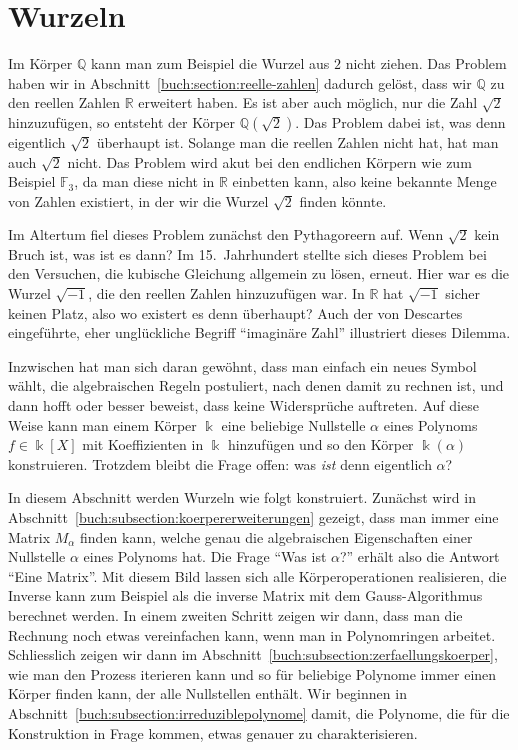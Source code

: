 %
%
%
\section{Wurzeln
\label{buch:section:wurzeln}}
Im Körper $\mathbb{Q}$ kann man zum Beispiel die Wurzel aus $2$ nicht 
ziehen.
Das Problem haben wir in Abschnitt~\ref{buch:section:reelle-zahlen}
dadurch gelöst, dass wir $\mathbb{Q}$ zu den reellen Zahlen $\mathbb{R}$
erweitert haben.
Es ist aber auch möglich, nur die Zahl $\sqrt{2}$ hinzuzufügen,
so entsteht der Körper $\mathbb{Q}(\sqrt{2})$.
Das Problem dabei ist, was denn eigentlich $\sqrt{2}$ überhaupt ist.
Solange man die reellen Zahlen nicht hat, hat man auch $\sqrt{2}$ nicht.
Das Problem wird akut bei den endlichen Körpern wie zum Beispiel
$\mathbb{F}_3$,
da man diese nicht in $\mathbb{R}$ einbetten kann, also keine
bekannte Menge von Zahlen existiert, in der wir die Wurzel $\sqrt{2}$
finden könnte.

Im Altertum fiel dieses Problem zunächst den Pythagoreern auf.
Wenn $\sqrt{2}$ kein Bruch ist, was ist es dann?
Im 15.~Jahrhundert stellte sich dieses Problem bei den Versuchen, die
kubische Gleichung allgemein zu lösen, erneut.
Hier war es die Wurzel $\sqrt{-1}$, die den reellen Zahlen hinzuzufügen
war.
In $\mathbb{R}$ hat $\sqrt{-1}$ sicher keinen Platz, also wo existert
es denn überhaupt?
Auch der von Descartes eingeführte, eher unglückliche Begriff
``imaginäre Zahl'' illustriert dieses Dilemma.

Inzwischen hat man sich daran gewöhnt, dass man einfach ein neues Symbol
wählt, die algebraischen Regeln postuliert, nach denen damit zu rechnen
ist, und dann hofft oder besser beweist, dass keine Widersprüche auftreten.
Auf diese Weise kann man einem Körper $\Bbbk$ eine beliebige 
Nullstelle $\alpha$ eines Polynoms $f\in\Bbbk[X]$ mit Koeffizienten
in $\Bbbk$ hinzufügen und so den Körper $\Bbbk(\alpha)$ konstruieren.
Trotzdem bleibt die Frage offen: was {\em ist} denn eigentlich $\alpha$?

In diesem Abschnitt werden Wurzeln wie folgt konstruiert.
Zunächst wird in Abschnitt~\ref{buch:subsection:koerpererweiterungen}
gezeigt, dass man immer eine Matrix $M_\alpha$ finden kann, welche
genau die algebraischen Eigenschaften einer Nullstelle $\alpha$ eines
Polynoms hat.
Die Frage ``Was ist $\alpha$?'' erhält also die Antwort ``Eine Matrix''.
Mit diesem Bild lassen sich alle Körperoperationen realisieren, die
Inverse kann zum Beispiel als die inverse Matrix mit dem
Gauss-Algorithmus berechnet werden.
In einem zweiten Schritt zeigen wir dann, dass man die Rechnung noch
etwas vereinfachen kann, wenn man in Polynomringen arbeitet.
Schliesslich zeigen wir dann im
Abschnitt~\ref{buch:subsection:zerfaellungskoerper}, wie man 
den Prozess iterieren kann und so für beliebige Polynome immer einen
Körper finden kann, der alle Nullstellen enthält.
Wir beginnen in Abschnitt~\ref{buch:subsection:irreduziblepolynome}
damit, die Polynome, die für die Konstruktion in Frage kommen, etwas
genauer zu charakterisieren.


